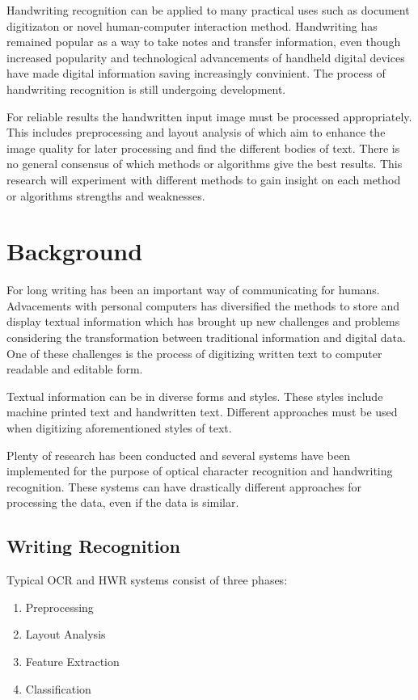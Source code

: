 \documentclass{article}
\begin{document}
    Handwriting recognition can be applied to many practical uses such as document digitizaton or novel human-computer interaction method. Handwriting has remained popular as a way to take notes and transfer information, even though increased popularity and technological advancements of handheld digital devices have made digital information saving increasingly convinient. The process of handwriting recognition is still undergoing development.

    For reliable results the handwritten input image must be processed appropriately. This includes preprocessing and layout analysis of which aim to enhance the image quality for later processing and find the different bodies of text. There is no general consensus of which methods or algorithms give the best results. This research will experiment with different methods to gain insight on each method or algorithms strengths and weaknesses.

  \newpage
  \section{Background}
    For long writing has been an important way of communicating for humans.  Advacements with personal computers has diversified the methods to store and display textual information which has brought up new challenges and problems considering the transformation between traditional information and digital data. One of these challenges is the process of digitizing written text to computer readable and editable form.

    Textual information can be in diverse forms and styles. These styles include machine printed text and handwritten text. Different approaches must be used when digitizing aforementioned styles of text.

    Plenty of research has been conducted and several systems have been implemented for the purpose of optical character recognition and handwriting recognition. These systems can have drastically different approaches for processing the data, even if the data is similar.

  \subsection{Writing Recognition}
    Typical OCR and HWR systems consist of three phases:
    \begin{enumerate}
      \item{Preprocessing}
      \item{Layout Analysis}
      \item{Feature Extraction}
      \item{Classification}
    \end{enumerate}
\end{document}
